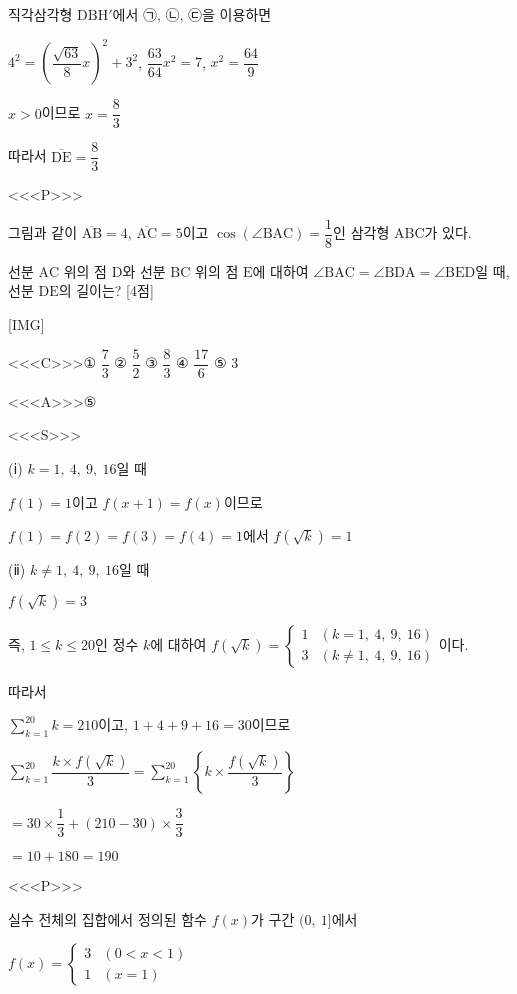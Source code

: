 \documentclass{oblivoir}
\begin{document}
직각삼각형 $\mathrm{DBH}'$에서 ㉠, ㉡, ㉢을 이용하면

$4^{2}=\left(\dfrac{\sqrt{63}}{8}x\right)^{2}+3^{2}$, $\dfrac{63}{64}x^{2}=7$, $x^{2}=\dfrac{64}{9}$

$x>0$이므로 $x=\dfrac{8}{3}$

따라서 $\overline{\mathrm{DE}}=\dfrac{8}{3}$

<<<P>>>

그림과 같이 $\overline{\mathrm{AB}} = 4$, $\overline{\mathrm{AC}} =5$이고 $\cos(\angle\mathrm{BAC})=\dfrac{1}{8}$인 삼각형 $\mathrm{ABC}$가 있다.

선분 $\mathrm{AC}$ 위의 점 $\mathrm{D}$와 선분 $\mathrm{BC}$ 위의 점 $\mathrm{E}$에 대하여 $\angle\mathrm{BAC}=\angle\mathrm{BDA}=\angle\mathrm{BED}$일 때, 선분 $\mathrm{DE}$의 길이는? [4점]

[IMG]

<<<C>>>① $\dfrac{7}{3}$ ② $\dfrac{5}{2}$ ③ $\dfrac{8}{3}$ ④ $\dfrac{17}{6}$ ⑤ $3$

<<<A>>>⑤

<<<S>>>

(ⅰ) $k=1,\:4,\:9,\:16$일 때

$f(1)=1$이고 $f(x+1)=f(x)$이므로

$f(1)=f(2)=f(3)=f(4)=1$에서 $f(\sqrt{k})=1$

(ⅱ) $k\ne 1,\:4,\:9,\:16$일 때

$f(\sqrt{k})=3$

즉, $1\le k\le 20$인 정수 $k$에 대하여 $f(\sqrt{k})=\begin{cases}
1&(k=1,\:4,\: 9,\: 16)\\
3&(k\ne 1,\:4,\: 9,\: 16)
\end{cases}$이다.

따라서

$\displaystyle\sum_{k=1}^{20}k=210$이고, $1+4+9+16=30$이므로

$\displaystyle\sum_{k=1}^{20}\dfrac{k\times f(\sqrt{k})}{3}$$=\displaystyle\sum_{k=1}^{20}\left\{k\times\dfrac{f(\sqrt{k})}{3}\right\}$

$=30\times\dfrac{1}{3}+(210-30)\times\dfrac{3}{3}$

$=10+180=190$

<<<P>>>

실수 전체의 집합에서 정의된 함수 $f(x)$가 구간 $(0,\:1]$에서

$f(x)=\begin{cases}
3&(0< x< 1)\\
1&(x=1)
\end{cases}$
\end{document}
